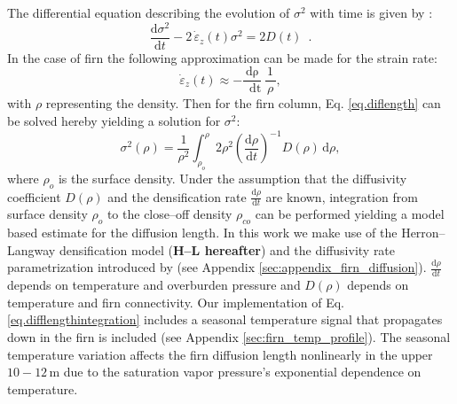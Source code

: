 \documentclass[11pt, draftcls, onecolumn]{IEEEtran} %
\numberwithin{equation}{section}
\numberwithin{table}{section}
\numberwithin{figure}{section}
\begin{document}
The differential equation describing the evolution of $\sigma^2$ with time is 
given by \citep{Johnsen1977}: 
\begin{equation}
\frac{\mathrm{d}\sigma^2}{\mathrm{d}t} - 2\,\dot{\varepsilon}_z\!\left( t \right) \sigma^2 = 
2D\!\left( t \right) \enspace .
\label{eq.diflength}
\end{equation}
In the case of firn the following approximation can be made for the strain rate:
\begin{equation}
\dot{\varepsilon}_z \left(
	t \right) \approx -\frac{\mathrm{d\rho}}{\,\,\,\mathrm{d t}}\,\frac{\,1\,}{\,\rho\,},
\label{eq.strainrate}
\end{equation}
with $\rho$ representing the density.
Then for the firn column, Eq. \ref{eq.diflength} can be solved hereby yielding a solution for $\sigma^2$:
\begin{equation}
\sigma^2 \left( \rho \right) = \frac{\,1\,}{\rho^2}\int_{\rho_o}^{\rho}2\rho^2 
{\left( \frac{\mathrm{d}\rho}{\mathrm{d}t}\right)}^{-1}\! D \!\left( \rho \right) \,\mathrm{d}\rho , 
\label{eq.difflengthintegration}
\end{equation}
where  $\rho_o$ is the surface density. 
Under the assumption that the diffusivity coefficient $D\left(\rho\right)$ and the
densification rate   $\frac{\mathrm{d}\rho}{\mathrm{d}t}$ are known,
integration from surface density $\rho_o$ to the close--off density $\rho_{co}$
can be performed yielding a model based estimate for the diffusion length.
In this work we make use of the Herron--Langway densification model (\textbf{H--L hereafter})
and the diffusivity rate parametrization introduced by \cite{Johnsen2000} (see Appendix \ref{sec:appendix_firn_diffusion}).
$\frac{\mathrm{d}\rho}{\mathrm{d}t}$ depends on temperature and overburden pressure
and $D\left(\rho\right)$ depends on temperature and firn connectivity.
Our implementation of Eq. \ref{eq.difflengthintegration} includes a seasonal temperature signal that propagates down in the firn is included (see Appendix \ref{sec:firn_temp_profile}).
The seasonal temperature variation affects the firn diffusion length nonlinearly in the upper $10-12 \, \mathrm{m}$ due to the saturation vapor pressure's exponential
dependence on temperature.
\end{document}
